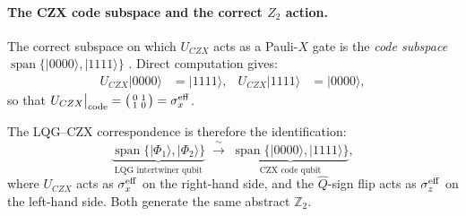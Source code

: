 \documentclass[preprint]{SciPost}
\newcommand{\ket}[1]{\vert #1 \rangle}
\theoremstyle{plain} %
\begin{document}
\paragraph{The CZX code subspace and the correct $Z_2$ action.}
The correct subspace on which $U_{CZX}$ acts as a Pauli-$X$ gate is the \emph{code subspace} $\operatorname{span}\{\ket{0000},\ket{1111}\}$ \cite{Chen2010Local}. Direct computation gives:
\begin{align}
  U_{CZX}\ket{0000} &= \ket{1111}, & U_{CZX}\ket{1111} &= \ket{0000},
\end{align}
so that $U_{CZX}\big|_{\rm code} = \bigl(\begin{smallmatrix}0&1\\1&0\end{smallmatrix}\bigr) = \sigma_x^{\rm eff}$.

The LQG--CZX correspondence is therefore the identification:
\begin{equation}
  \underbrace{\operatorname{span}\{\ket{\Phi_1},\ket{\Phi_2}\}}_{\text{LQG intertwiner qubit}}
  \;\xrightarrow{\;\sim\;}\;
  \underbrace{\operatorname{span}\{\ket{0000},\ket{1111}\}}_{\text{CZX code qubit}},
\end{equation}
where $U_{CZX}$ acts as $\sigma_x^{\rm eff}$ on the right-hand side, and the $\hat{Q}$-sign flip acts as $\sigma_z^{\rm eff}$ on the left-hand side. Both generate the same abstract $\mathbb{Z}_2$.
\end{document}
